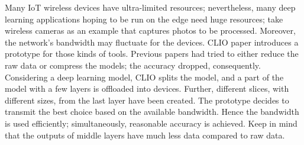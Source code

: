 \par
Many IoT wireless devices have ultra-limited resources; nevertheless, many deep learning applications hoping to be run on the edge need huge resources; take wireless cameras as an example that captures photos to be processed. Moreover, the network's bandwidth may fluctuate for the devices. CLIO paper \cite{10.1145/3372224.3419215} introduces a prototype for those kinds of tools. Previous papers had tried to either reduce the raw data or compress the models; the accuracy dropped, consequently. Considering a deep learning model, CLIO splits the model, and a part of the model with a few layers is offloaded into devices. Further, different slices, with different sizes, from the last layer have been created. The prototype decides to transmit the best choice based on the available bandwidth. Hence the bandwidth is used efficiently; simultaneously, reasonable accuracy is achieved. Keep in mind that the outputs of middle layers have much less data compared to raw data. 
